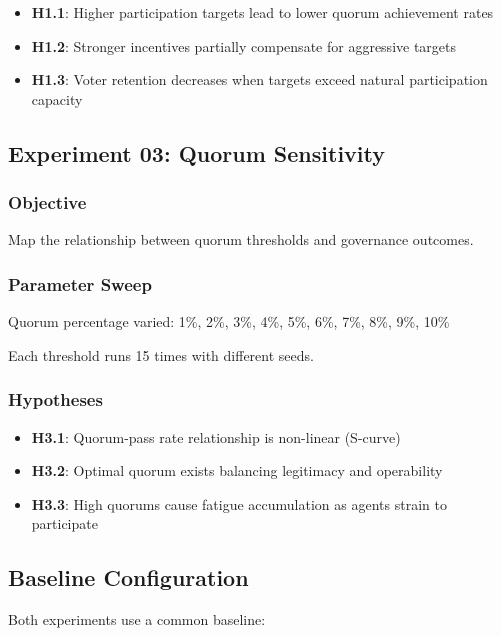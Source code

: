 \begin{itemize}
    \item \textbf{H1.1}: Higher participation targets lead to lower quorum achievement rates
    \item \textbf{H1.2}: Stronger incentives partially compensate for aggressive targets
    \item \textbf{H1.3}: Voter retention decreases when targets exceed natural participation capacity
\end{itemize}

\subsection{Experiment 03: Quorum Sensitivity}

\subsubsection{Objective}

Map the relationship between quorum thresholds and governance outcomes.

\subsubsection{Parameter Sweep}

Quorum percentage varied: 1\%, 2\%, 3\%, 4\%, 5\%, 6\%, 7\%, 8\%, 9\%, 10\%

Each threshold runs 15 times with different seeds.

\subsubsection{Hypotheses}

\begin{itemize}
    \item \textbf{H3.1}: Quorum-pass rate relationship is non-linear (S-curve)
    \item \textbf{H3.2}: Optimal quorum exists balancing legitimacy and operability
    \item \textbf{H3.3}: High quorums cause fatigue accumulation as agents strain to participate
\end{itemize}

\subsection{Baseline Configuration}

Both experiments use a common baseline:

